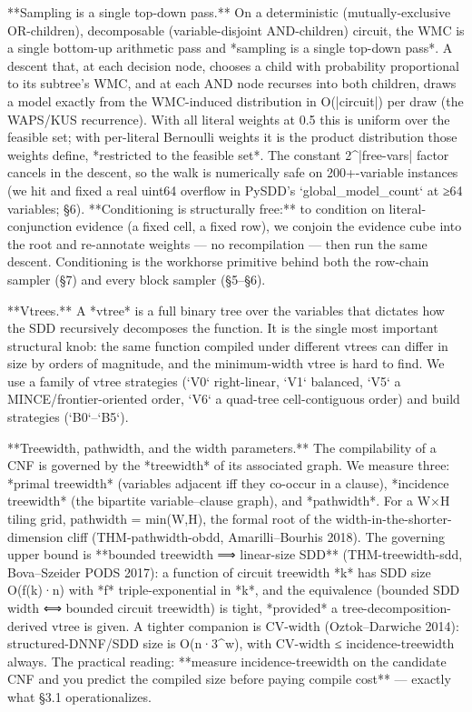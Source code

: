 \documentclass[letterpaper]{article} %
\begin{document}
**Sampling is a single top-down pass.** On a deterministic (mutually-exclusive OR-children),
decomposable (variable-disjoint AND-children) circuit, the WMC is a single bottom-up arithmetic pass
and *sampling is a single top-down pass*. A descent that, at each decision node, chooses a child with
probability proportional to its subtree's WMC, and at each AND node recurses into both children,
draws a model exactly from the WMC-induced distribution in O(|circuit|) per draw (the WAPS/KUS
recurrence). With all literal weights at 0.5 this is uniform over the feasible set; with per-literal
Bernoulli weights it is the product distribution those weights define, *restricted to the feasible
set*. The constant 2^|free-vars| factor cancels in the descent, so the walk is numerically safe on
200+-variable instances (we hit and fixed a real uint64 overflow in PySDD's `global_model_count` at
≥64 variables; §6). **Conditioning is structurally free:** to condition on literal-conjunction
evidence (a fixed cell, a fixed row), we conjoin the evidence cube into the root and re-annotate
weights — no recompilation — then run the same descent. Conditioning is the workhorse primitive
behind both the row-chain sampler (§7) and every block sampler (§5–§6).

**Vtrees.** A *vtree* is a full binary tree over the variables that dictates how the SDD recursively
decomposes the function. It is the single most important structural knob: the same function compiled
under different vtrees can differ in size by orders of magnitude, and the minimum-width vtree is hard
to find. We use a family of vtree strategies (`V0` right-linear, `V1` balanced, `V5` a
MINCE/frontier-oriented order, `V6` a quad-tree cell-contiguous order) and build strategies (`B0`–`B5`).

**Treewidth, pathwidth, and the width parameters.** The compilability of a CNF is governed by the
*treewidth* of its associated graph. We measure three: *primal treewidth* (variables adjacent iff
they co-occur in a clause), *incidence treewidth* (the bipartite variable–clause graph), and
*pathwidth*. For a W×H tiling grid, pathwidth = min(W,H), the formal root of the
width-in-the-shorter-dimension cliff (THM-pathwidth-obdd, Amarilli–Bourhis 2018). The governing upper
bound is **bounded treewidth ⟹ linear-size SDD** (THM-treewidth-sdd, Bova–Szeider PODS 2017): a
function of circuit treewidth *k* has SDD size O(f(k)·n) with *f* triple-exponential in *k*, and the
equivalence (bounded SDD width ⟺ bounded circuit treewidth) is tight, *provided* a
tree-decomposition-derived vtree is given. A tighter companion is CV-width (Oztok–Darwiche 2014):
structured-DNNF/SDD size is O(n·3^w), with CV-width ≤ incidence-treewidth always. The practical
reading: **measure incidence-treewidth on the candidate CNF and you predict the compiled size before
paying compile cost** — exactly what §3.1 operationalizes.
\end{document}
